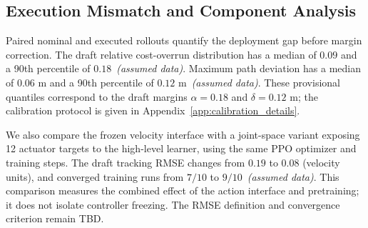 \documentclass{article}
\begin{document}
\subsection{Execution Mismatch and Component Analysis}
\label{sec:mismatch_analysis}
Paired nominal and executed rollouts quantify the deployment gap before margin
correction. The draft relative cost-overrun distribution has a median of $0.09$
and a 90th percentile of $0.18$~\textit{(assumed data)}. Maximum path deviation
has a median of $0.06$ m and a 90th percentile of $0.12$ m~\textit{(assumed data)}.
These provisional quantiles correspond to the draft margins $\alpha=0.18$ and
$\delta=0.12$ m; the calibration protocol is given in
Appendix~\ref{app:calibration_details}.

We also compare the frozen velocity interface with a joint-space variant exposing
12 actuator targets to the high-level learner, using the same PPO optimizer and
training steps. The draft tracking RMSE changes from $0.19$ to $0.08$ (velocity
units), and converged training runs from $7/10$ to $9/10$~\textit{(assumed data)}.
This comparison measures the combined effect of the action interface and
pretraining; it does not isolate controller freezing. The RMSE definition and
convergence criterion remain \textsc{TBD}.
\end{document}
